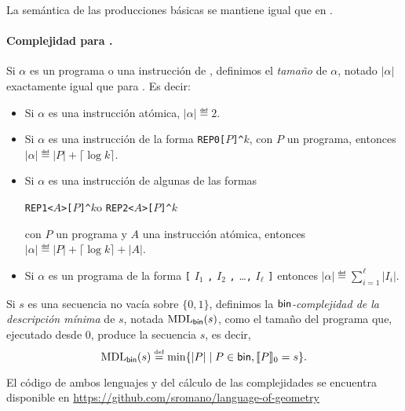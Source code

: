 \medskip

La semántica de las producciones básicas se mantiene igual que en \gramgeo.

\paragraph{Complejidad para \grambin.} 

Si $\alpha$ es un programa o una instrucción de \grambin, definimos el {\em tamaño} de $\alpha$, notado $|\alpha|$ exactamente igual que para \grambin. Es decir:
%
\begin{itemize}
\item Si $\alpha$ es una instrucción atómica, $|\alpha|\eqdef 2$.

\item Si $\alpha$ es una instrucción de la forma 
\verb#REP0[#$P$\verb#]^#$k$, con $P$ un programa, 
entonces $|\alpha|\eqdef |P|+\lceil \log k\rceil$.

\item Si $\alpha$ es una instrucción de algunas de las formas
\begin{center}
\verb#REP1<#$A$\verb#>[#$P$\verb#]^#$k$\quad o\quad 
\verb#REP2<#$A$\verb#>[#$P$\verb#]^#$k$ 
\end{center}
con $P$ un programa y $A$ una instrucción atómica, 
entonces $|\alpha|\eqdef |P|+\lceil \log k\rceil+|A|$.

\item Si $\alpha$ es un programa de la forma
\verb#[# $I_1$ \verb#,# $I_2$ \verb#,# \dots \verb#,# $I_\ell$ \verb#]#
entonces $|\alpha|\eqdef \sum_{i=1}^\ell|I_i|$.
\end{itemize}
%
Si $s$ es una secuencia no vacía sobre $\{0,1\}$, definimos la {\em ${\sf bin}$-complejidad de la descripción mínima} de $s$, notada ${\rm MDL}_{{\sf bin}}(s)$, como el tamaño del programa que, ejecutado desde 0, produce la secuencia $s$, es decir,
$$
{\rm MDL}_{{\sf bin}}(s)\stackrel{\scriptscriptstyle \mathrm{def}}{=}\min\{|P|\mid P\in{\sf bin},\llbracket P\rrbracket_0=s\}.
$$


El código de ambos lenguajes y del cálculo de las complejidades se encuentra disponible en \hyperref[https://github.com/sromano/language-of-geometry]{\url{https://github.com/sromano/language-of-geometry}}

\renewcommand{\thetable}{\arabic{chapter}.\arabic{figure}}
\renewcommand{\thefigure}{\arabic{chapter}.\arabic{figure}}